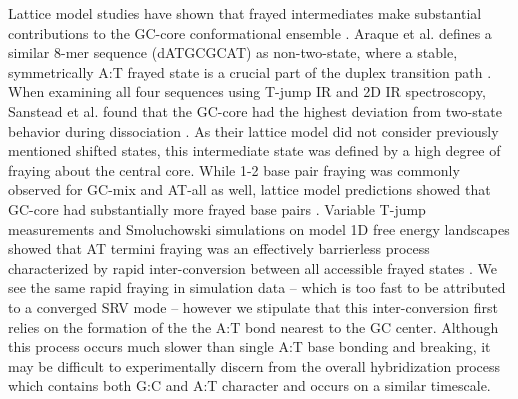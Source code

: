 \documentclass[journal=jpcbfk,manuscript=article]{achemso}
\begin{document}
Lattice model studies have shown that frayed intermediates make substantial contributions to the GC-core conformational ensemble \citep{Araque2016LatticeCooperativity, Phys2019}. Araque et al. defines a similar 8-mer sequence (dATGCGCAT) as non-two-state, where a stable, symmetrically A:T frayed state is a crucial part of the duplex transition path \citep{Araque2016LatticeCooperativity}. When examining all four sequences using T-jump IR and 2D IR spectroscopy, Sanstead et al. found that the GC-core had the highest deviation from two-state behavior during dissociation \citep{Sanstead2016}. As their lattice model did not consider previously mentioned shifted states, this intermediate state was defined by a high degree of fraying about the central core. While 1-2 base pair fraying was commonly observed for GC-mix and AT-all as well, lattice model predictions showed that GC-core had substantially more frayed base pairs \citep{Phys2019}. Variable T-jump measurements and Smoluchowski simulations on model 1D free energy landscapes showed that AT termini fraying was an effectively barrierless process characterized by rapid inter-conversion between all accessible frayed states \citep{Sanstead2018DirectDehybridization}. We see the same rapid fraying in simulation data -- which is too fast to be attributed to a converged SRV mode -- however we stipulate that this inter-conversion first relies on the formation of the the A:T bond nearest to the GC center.  Although this process occurs much slower than single A:T base bonding and breaking, it may be difficult to experimentally discern from the overall hybridization process which contains both G:C and A:T character and occurs on a similar timescale.

\end{document}
